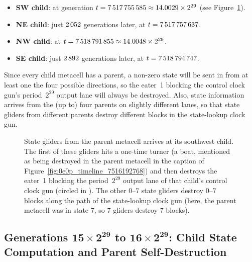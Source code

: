 \begin{itemize}
	\item \textbf{SW child}: at generation $t = 7{\,}517{\,}755{\,}585 \approx 14.0029 \times 2^{29}$ (see Figure~\ref{fig:0e0p_timeline_7517755585}).\smallskip
	
	\item \textbf{NE child}: just $2{\,}052$ generations later, at $t = 7{\,}517{\,}757{\,}637$.\smallskip
	
	\item \textbf{NW child}: at $t = 7{\,}518{\,}791{\,}855 \approx 14.0048 \times 2^{29}$.\smallskip
	
	\item \textbf{SE child}: just $2{\,}892$ generations later, at $t = 7{\,}518{\,}794{\,}747$.\smallskip
\end{itemize}

Since every child metacell has a parent, a non-zero state will be sent in from at least one the four possible directions, so the eater~1 blocking the control clock gun's period~$2^{29}$ output lane will always be destroyed. Also, state information arrives from the (up to) four parents on slightly different lanes, so that state gliders from different parents destroy different blocks in the state-lookup clock gun.

\begin{figure}[!htb]
	\centering
	\caption{State gliders from the parent metacell arrives at its southwest child. The first of these gliders hits a one-time turner (a boat, mentioned as being destroyed in the parent metacell in the caption of Figure~\ref{fig:0e0p_timeline_7516192768}) and then destroys the eater~1 blocking the period~$2^{29}$ output lane of that child's control clock gun (circled in ). The other $0$--$7$ state gliders destroy $0$--$7$ blocks along the path of the state-lookup clock gun (here, the parent metacell was in state $7$, so $7$ gliders destroy $7$ blocks).}
	\label{fig:0e0p_timeline_7517755585}
\end{figure}


\subsection{Generations $\mathbf{15 \times 2^{29}}$ to $\mathbf{16 \times 2^{29}}$: Child State Computation and Parent Self-Destruction}\label{sec:0e0p_timeline_self_dest}

